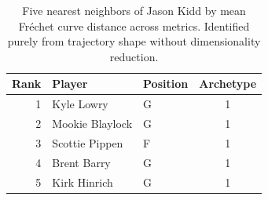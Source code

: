 \begin{table}[htbp]
  \centering\small
  \begin{tabular}{rllc}
    \toprule
    Rank & Player & Position & Archetype \\
    \midrule
    1 & Kyle Lowry & G & 1 \\
    2 & Mookie Blaylock & G & 1 \\
    3 & Scottie Pippen & F & 1 \\
    4 & Brent Barry & G & 1 \\
    5 & Kirk Hinrich & G & 1 \\
    \bottomrule
  \end{tabular}
  \caption{Five nearest neighbors of Jason Kidd by mean Fr\'{e}chet curve distance across metrics. Identified purely from trajectory shape without dimensionality reduction.}
  \label{tab:Jason_Kidd_frechet_curve_neighbors}
\end{table}

